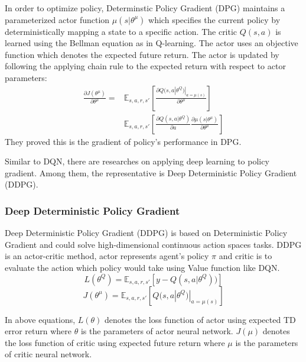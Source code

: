 \documentclass[11pt,twocolumn]{jarticle} %
\begin{document}
In order to optimize policy, Determinstic Policy Gradient (DPG) maintains a parameterized actor function $\mu(s|\theta^\mu)$ which specifies the current policy by deterministically mapping a state to a specific action. The critic $Q(s, a)$ is learned using the Bellman equation as in Q-learning. The actor uses an objective function which denotes the expected future return. The actor is updated by following the applying chain rule to the expected return with respect to actor parameters:
\begin{equation}
\label{dpg_prove}
\begin{split}
\frac{\partial J(\theta^\mu)}{\partial \theta^\mu} = 
& \mathbb{E}_{s,a,r,s'}[\frac{\partial Q(s, a|\theta^Q)|_{a = \mu(s)}}{\partial \theta^\mu}] \\
& \mathbb{E}_{s,a,r,s'}[\frac{\partial Q(s, a|\theta^Q)}{\partial a} \frac{\partial \mu(s|\theta^\mu)}{\partial \theta^\mu}]
\end{split}
\end{equation}
They proved this is the gradient of policy's performance in DPG\cite{dpg}. \par

Similar to DQN, there are researches on applying deep learning to policy gradient. Among them, the representative is Deep Deterministic Policy Gradient (DDPG)\cite{ddpg}. 

\subsubsection{Deep Deterministic Policy Gradient\cite{ddpg}}
Deep Deterministic Policy Gradient (DDPG) is based on Deterministic Policy Gradient\cite{dpg} and could solve high-dimensional continuous action spaces tasks. DDPG is an actor-critic method, actor represents agent's policy $\pi$ and critic is to evaluate the action which policy would take using Value function like DQN. 
\begin{equation}
L(\theta^Q) = \mathbb{E}_{s,a,r,s'}[y - Q(s, a|\theta^Q))] 
\end{equation}
\begin{equation}
J(\theta^\mu) = \mathbb{E}_{s,a,r,s'}[Q(s, a|\theta^Q) | _{a=\mu(s)}]
\end{equation}

In above equations, $L(\theta)$ denotes the loss function of actor using expected TD error return where $\theta$ is the parameters of actor neural network. $J(\mu)$ denotes the loss function of critic using expected future return where $\mu$ is the parameters of critic neural network. \par
\end{document}
